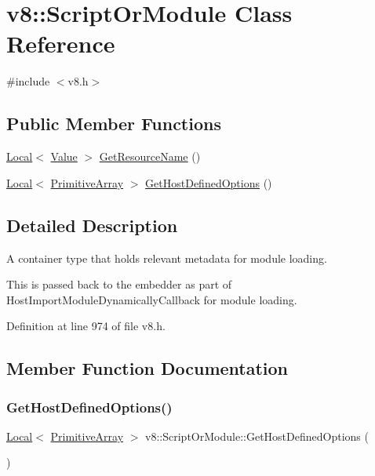 \hypertarget{classv8_1_1ScriptOrModule}{}\section{v8\+:\+:Script\+Or\+Module Class Reference}
\label{classv8_1_1ScriptOrModule}


{\ttfamily \#include $<$v8.\+h$>$}

\subsection*{Public Member Functions}
\begin{DoxyCompactItemize}
\item 
\mbox{\hyperlink{classv8_1_1Local}{Local}}$<$ \mbox{\hyperlink{classv8_1_1Value}{Value}} $>$ \mbox{\hyperlink{classv8_1_1ScriptOrModule_a024fd24a2bf984ae22a274be30453871}{Get\+Resource\+Name}} ()
\item 
\mbox{\hyperlink{classv8_1_1Local}{Local}}$<$ \mbox{\hyperlink{classv8_1_1PrimitiveArray}{Primitive\+Array}} $>$ \mbox{\hyperlink{classv8_1_1ScriptOrModule_a73b59df590c595c960b970ac75c870cf}{Get\+Host\+Defined\+Options}} ()
\end{DoxyCompactItemize}


\subsection{Detailed Description}
A container type that holds relevant metadata for module loading.

This is passed back to the embedder as part of Host\+Import\+Module\+Dynamically\+Callback for module loading. 

Definition at line 974 of file v8.\+h.



\subsection{Member Function Documentation}
\mbox{\label{classv8_1_1ScriptOrModule_a73b59df590c595c960b970ac75c870cf}} 
\subsubsection{\texorpdfstring{Get\+Host\+Defined\+Options()}{GetHostDefinedOptions()}}
{\footnotesize\ttfamily \mbox{\hyperlink{classv8_1_1Local}{Local}}$<$ \mbox{\hyperlink{classv8_1_1PrimitiveArray}{Primitive\+Array}} $>$ v8\+::\+Script\+Or\+Module\+::\+Get\+Host\+Defined\+Options (\begin{DoxyParamCaption}{ }\end{DoxyParamCaption})}

